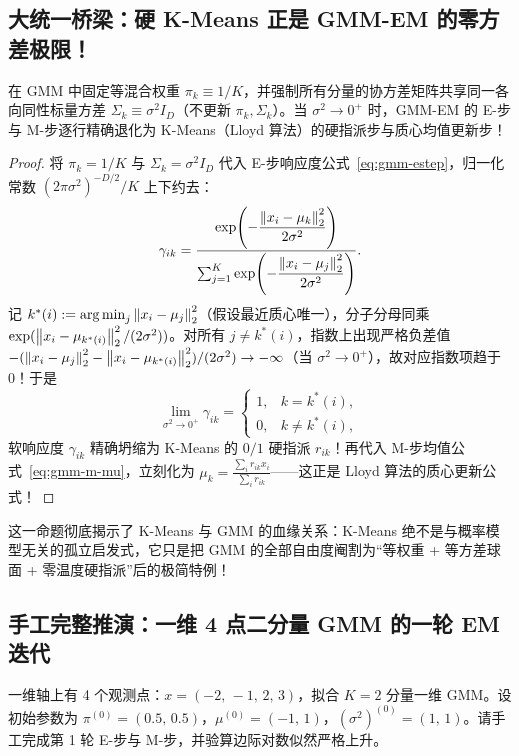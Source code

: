 \subsection{大统一桥梁：硬 K-Means 正是 GMM-EM 的零方差极限！}

\begin{thmBox}
\begin{proposition}\label{prop:kmeans-gmm-limit}
在 GMM 中固定等混合权重 $\pi_k \equiv 1/K$，并强制所有分量的协方差矩阵共享同一各向同性标量方差 $\Sigma_k \equiv \sigma^2 I_D$（不更新 $\pi_k, \Sigma_k$）。当 $\sigma^2 \to 0^+$ 时，GMM-EM 的 E-步与 M-步逐行精确退化为 K-Means（Lloyd 算法）的硬指派步与质心均值更新步！
\end{proposition}
\end{thmBox}

\begin{proof}
将 $\pi_k = 1/K$ 与 $\Sigma_k = \sigma^2 I_D$ 代入 E-步响应度公式~\eqref{eq:gmm-estep}，归一化常数 $(2\pi\sigma^2)^{-D/2} / K$ 上下约去：
\[
  \gamma_{ik} = \frac{\exp\!\left(-\dfrac{\left\|x_i - \mu_k\right\|_2^2}{2\sigma^2}\right)}{\sum_{j=1}^{K} \exp\!\left(-\dfrac{\left\|x_i - \mu_j\right\|_2^2}{2\sigma^2}\right)}.
\]
记 $k^*(i) := \operatorname*{arg\,min}_j \left\|x_i - \mu_j\right\|_2^2$（假设最近质心唯一），分子分母同乘 $\exp(\left\|x_i - \mu_{k^*(i)}\right\|_2^2 / (2\sigma^2))$。对所有 $j \neq k^*(i)$，指数上出现严格负差值 $-(\left\|x_i - \mu_j\right\|_2^2 - \left\|x_i - \mu_{k^*(i)}\right\|_2^2)/(2\sigma^2) \to -\infty$（当 $\sigma^2 \to 0^+$），故对应指数项趋于 $0$！于是
\[
  \lim_{\sigma^2 \to 0^+} \gamma_{ik} = \begin{cases} 1, & k = k^*(i), \\ 0, & k \neq k^*(i), \end{cases}
\]
软响应度 $\gamma_{ik}$ 精确坍缩为 K-Means 的 $0/1$ 硬指派 $r_{ik}$！再代入 M-步均值公式~\eqref{eq:gmm-m-mu}，立刻化为 $\mu_k = \frac{\sum_i r_{ik} x_i}{\sum_i r_{ik}}$——这正是 Lloyd 算法的质心更新公式！
\end{proof}

这一命题彻底揭示了 K-Means 与 GMM 的血缘关系：K-Means 绝不是与概率模型无关的孤立启发式，它只是把 GMM 的全部自由度阉割为“等权重 + 等方差球面 + 零温度硬指派”后的极简特例！

\subsection{手工完整推演：一维 4 点二分量 GMM 的一轮 EM 迭代}

\begin{example}\label{ex:gmm-hand}
一维轴上有 4 个观测点：$x = (-2,\, -1,\, 2,\, 3)$，拟合 $K = 2$ 分量一维 GMM。设初始参数为 $\pi^{(0)} = (0.5,\, 0.5)$，$\mu^{(0)} = (-1,\, 1)$，$(\sigma^2)^{(0)} = (1,\, 1)$。请手工完成第 1 轮 E-步与 M-步，并验算边际对数似然严格上升。
\end{example}

